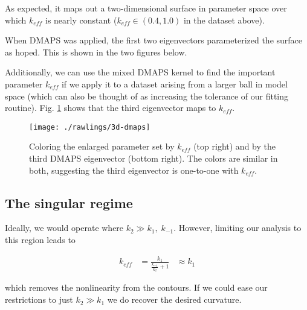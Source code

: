 \documentclass[11pt]{article}
\begin{document}
As expected, it maps out a two-dimensional surface in parameter space over which $k_{eff}$ is nearly constant ($k_{eff} \in (0.4, 1.0)$ in the dataset above).

When DMAPS was applied, the first two eigenvectors parameterized the surface as hoped. This is shown in the two figures below.



Additionally, we can use the mixed DMAPS kernel to find the important
parameter $k_{eff}$ if we apply it to a dataset arising from a larger
ball in model space (which can also be thought of as increasing the
tolerance of our fitting routine). Fig. \ref{fig:dmaps-mixed} shows
that the third eigenvector maps to $k_{eff}$.

\begin{figure}[htbp]
  \centering
  \texttt{[image: ./rawlings/3d-dmaps]}
  \caption{Coloring the enlarged parameter set by $k_{eff}$ (top
    right) and by the third DMAPS eigenvector (bottom right). The
    colors are similar in both, suggesting the third eigenvector is
    one-to-one with $k_{eff}$. \label{fig:dmaps-mixed}}
\end{figure}

\subsection{The singular regime}

Ideally, we would operate where $k_2 \gg k_1, \; k_{-1}$. However,
limiting our analysis to this region leads to

\begin{align*}
  k_{eff} &= \frac{k_1}{\frac{k_{-1}}{k_2} + 1}
  & \approx k_1
\end{align*}

which removes the nonlinearity from the contours. If we could ease our
restrictions to just $k_2 \gg k_1$ we do recover the desired curvature.
\end{document}
